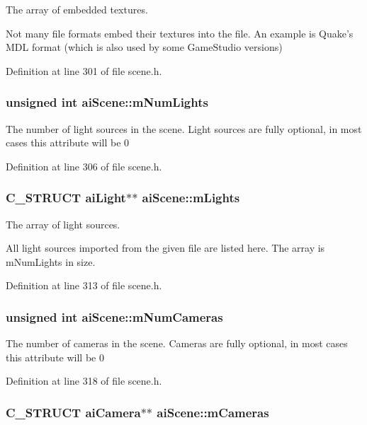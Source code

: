 The array of embedded textures.

Not many file formats embed their textures into the file. An example is Quake's MDL format (which is also used by some GameStudio versions) 

Definition at line 301 of file scene.h.\hypertarget{structai_scene_0c90fc5f15b979e0bb0d3e8f1e246307}{
\subsubsection[mNumLights]{\setlength{\rightskip}{0pt plus 5cm}unsigned int {\bf aiScene::mNumLights}}}
\label{structai_scene_0c90fc5f15b979e0bb0d3e8f1e246307}


The number of light sources in the scene. Light sources are fully optional, in most cases this attribute will be 0 

Definition at line 306 of file scene.h.\hypertarget{structai_scene_2e64a69ade81cae0b3901bea90b6bb47}{
\subsubsection[mLights]{\setlength{\rightskip}{0pt plus 5cm}C\_\-STRUCT {\bf aiLight}$\ast$$\ast$ {\bf aiScene::mLights}}}
\label{structai_scene_2e64a69ade81cae0b3901bea90b6bb47}


The array of light sources.

All light sources imported from the given file are listed here. The array is mNumLights in size. 

Definition at line 313 of file scene.h.\hypertarget{structai_scene_4abc432e1b22a7e01553f33c79c0592f}{
\subsubsection[mNumCameras]{\setlength{\rightskip}{0pt plus 5cm}unsigned int {\bf aiScene::mNumCameras}}}
\label{structai_scene_4abc432e1b22a7e01553f33c79c0592f}


The number of cameras in the scene. Cameras are fully optional, in most cases this attribute will be 0 

Definition at line 318 of file scene.h.\hypertarget{structai_scene_71e7d204d96969ca4f5a931f4d636f1e}{
\subsubsection[mCameras]{\setlength{\rightskip}{0pt plus 5cm}C\_\-STRUCT {\bf aiCamera}$\ast$$\ast$ {\bf aiScene::mCameras}}}
\label{structai_scene_71e7d204d96969ca4f5a931f4d636f1e}


